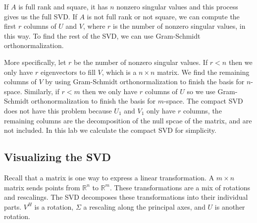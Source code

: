 If $A$ is full rank and square, it has $n$ nonzero singular values and this process gives us the full SVD.
If $A$ is not full rank or not square, we can compute the first $r$ columns of $U$ and $V$, where $r$ is the number of nonzero singular values, in this way.
To find the rest of the SVD, we can use Gram-Schmidt orthonormalization.

More specifically, let $r$ be the number of nonzero singular values.
If $r<n$ then we only have $r$ eigenvectors to fill $V$, which is a $n\times n$ matrix.
We find the remaining columns of $V$ by using Gram-Schmidt orthonormalization to finish the basis for $n$-space.
Similarly, if $r<m$ then we only have $r$ columns of $U$ so we use Gram-Schmidt orthonormalization to finish the basis for $m$-space.
The compact SVD does not have this problem because $U_1$ and $V_1$ only have $r$ columns, the remaining columns are the decomposition of the null spcae of the matrix, and are not included.
In this lab we calculate the compact SVD for simplicity.


\subsection*{Visualizing the SVD}

Recall that a matrix is one way to express a linear transformation.
A $m\times n$ matrix sends points from $\mathbb{R}^n$ to $\mathbb{R}^m$.
These transformations are a mix of rotations and rescalings.
The SVD decomposes these transformations into their individual parts.
$V^H$ is a rotation, $\Sigma$ a rescaling along the principal axes, and $U$ is another rotation.


